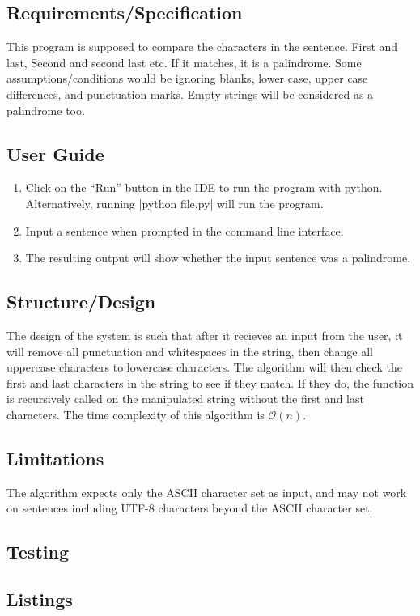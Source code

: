 \documentclass{report}
\begin{document}
\section{Requirements/Specification}
This program is supposed to compare the characters in the sentence. First and last, Second and second last etc. If it matches, it is a palindrome. Some assumptions/conditions would be ignoring blanks, lower case, upper case differences, and punctuation marks. Empty strings will be considered as a palindrome too.
\section{User Guide}
\begin{enumerate}
	\item Click on the ``Run'' button in the IDE to run the program with python. Alternatively, running |python file.py| will run the program.
	\item Input a sentence when prompted in the command line interface.
	\item The resulting output will show whether the input sentence was a palindrome.
\end{enumerate}
\section{Structure/Design}
The design of the system is such that after it recieves an input from the user, it will remove all punctuation and whitespaces in the string, then change all uppercase characters to lowercase characters. The algorithm will then check the first and last characters in the string to see if they match. If they do, the function is recursively called on the manipulated string without the first and last characters. The time complexity of this algorithm is \(\mathcal{O}(n)\).
\section{Limitations}
The algorithm expects only the ASCII character set as input, and may not work on sentences including UTF-8 characters beyond the ASCII character set.
\section{Testing}
\section{Listings}
\chapter{}
\end{document}
